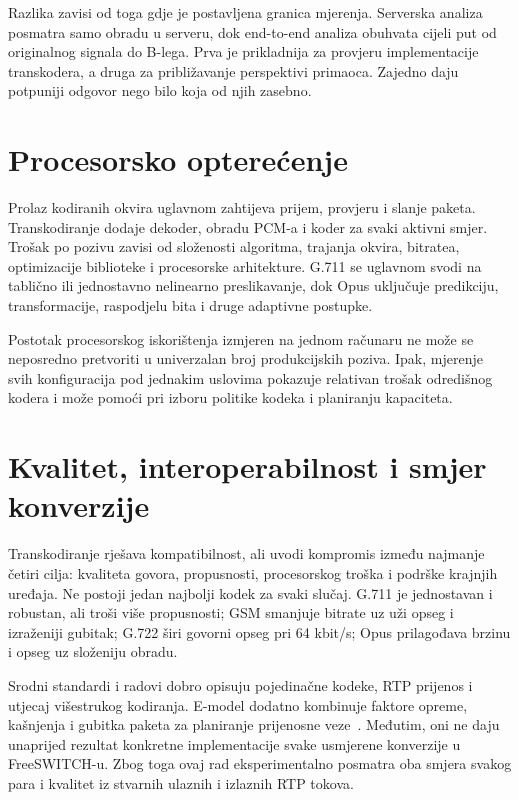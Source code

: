 Razlika zavisi od toga gdje je postavljena granica mjerenja. Serverska analiza posmatra samo obradu u serveru, dok end-to-end analiza obuhvata cijeli put od originalnog signala do B-lega. Prva je prikladnija za provjeru implementacije transkodera, a druga za približavanje perspektivi primaoca. Zajedno daju potpuniji odgovor nego bilo koja od njih zasebno.

\section{Procesorsko opterećenje}

Prolaz kodiranih okvira uglavnom zahtijeva prijem, provjeru i slanje paketa. Transkodiranje dodaje dekoder, obradu PCM-a i koder za svaki aktivni smjer. Trošak po pozivu zavisi od složenosti algoritma, trajanja okvira, bitratea, optimizacije biblioteke i procesorske arhitekture. G.711 se uglavnom svodi na tablično ili jednostavno nelinearno preslikavanje, dok Opus uključuje predikciju, transformacije, raspodjelu bita i druge adaptivne postupke.

Postotak procesorskog iskorištenja izmjeren na jednom računaru ne može se neposredno pretvoriti u univerzalan broj produkcijskih poziva. Ipak, mjerenje svih konfiguracija pod jednakim uslovima pokazuje relativan trošak odredišnog kodera i može pomoći pri izboru politike kodeka i planiranju kapaciteta.

\section{Kvalitet, interoperabilnost i smjer konverzije}

Transkodiranje rješava kompatibilnost, ali uvodi kompromis između najmanje četiri cilja: kvaliteta govora, propusnosti, procesorskog troška i podrške krajnjih uređaja. Ne postoji jedan najbolji kodek za svaki slučaj. G.711 je jednostavan i robustan, ali troši više propusnosti; GSM smanjuje bitrate uz uži opseg i izraženiji gubitak; G.722 širi govorni opseg pri 64 kbit/s; Opus prilagođava brzinu i opseg uz složeniju obradu.

Srodni standardi i radovi dobro opisuju pojedinačne kodeke, RTP prijenos i utjecaj višestrukog kodiranja. E-model dodatno kombinuje faktore opreme, kašnjenja i gubitka paketa za planiranje prijenosne veze~\cite{itu-g107,itu-g114}. Međutim, oni ne daju unaprijed rezultat konkretne implementacije svake usmjerene konverzije u FreeSWITCH-u. Zbog toga ovaj rad eksperimentalno posmatra oba smjera svakog para i kvalitet iz stvarnih ulaznih i izlaznih RTP tokova.
